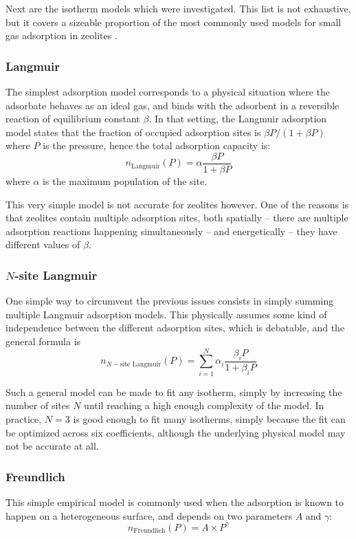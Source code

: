 \documentclass[main.tex]{subfiles}
\begin{document}
Next are the isotherm models which were investigated. This list is not exhaustive, but it covers a sizeable proportion of the most commonly used models for small gas adsorption in zeolites \autocite{AyaweiIsothermModels}.

\subsubsection{Langmuir}

The simplest adsorption model corresponds to a physical situation where the adsorbate behaves as an ideal gas, and binds with the adsorbent in a reversible reaction of equilibrium constant $\beta$. In that setting, the Langmuir adsorption model states that the fraction of occupied adsorption sites is $\beta P/(1+\beta P)$ where $P$ is the pressure, hence the total adsorption capacity is:
\[n_\text{Langmuir}(P) = \alpha\frac{\beta P}{1+\beta P}\]
where $\alpha$ is the maximum population of the site.

This very simple model is not accurate for zeolites however. One of the reasons is that zeolites contain multiple adsorption sites, both spatially -- there are multiple adsorption reactions happening simultaneously -- and energetically -- they have different values of $\beta$.

\subsubsection{$N$-site Langmuir}

One simple way to circumvent the previous issues consists in simply summing multiple Langmuir adsorption models. This physically assumes some kind of independence between the different adsorption sites, which is debatable, and the general formula is
\[n_{N-\text{site Langmuir}}(P) = \sum_{i=1}^N \alpha_i\frac{\beta_i P}{1+\beta_i P}\]

Such a general model can be made to fit any isotherm, simply by increasing the number of sites $N$ until reaching a high enough complexity of the model. In practice, $N=3$ is good enough to fit many isotherms, simply because the fit can be optimized across six coefficients, although the underlying physical model may not be accurate at all.

\subsubsection{Freundlich}

This simple empirical model is commonly used when the adsorption is known to happen on a heterogeneous surface, and depends on two parameters $A$ and $\gamma$:
\[n_\text{Freundlich}(P) = A\times P^\gamma\]
\end{document}
